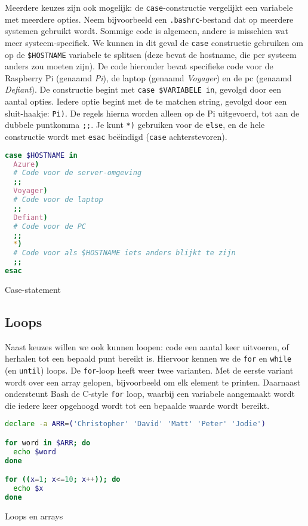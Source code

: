 Meerdere keuzes zijn ook mogelijk: de \texttt{case}-constructie vergelijkt een variabele met meerdere opties. Neem bijvoorbeeld een \texttt{.bashrc}-bestand dat op meerdere systemen gebruikt wordt. Sommige code is algemeen, andere is misschien wat meer systeem-specifiek. We kunnen in dit geval de \texttt{case} constructie gebruiken om op de \texttt{\$HOSTNAME} variabele te splitsen (deze bevat de hostname, die per systeem anders zou moeten zijn). De code hieronder bevat specifieke code voor de Raspberry Pi (genaamd \emph{Pi}), de laptop (genaamd \emph{Voyager}) en de pc (genaamd \emph{Defiant}). De constructie begint met \texttt{case\ \$VARIABELE\ in}, gevolgd door een aantal opties. Iedere optie begint met de te matchen string, gevolgd door een sluit-haakje: \texttt{Pi)}. De regels hierna worden alleen op de Pi uitgevoerd, tot aan de dubbele puntkomma \texttt{;;}. Je kunt \texttt{*)} gebruiken voor de \texttt{else}, en de hele constructie wordt met \texttt{esac} beëindigd (\texttt{case} achterstevoren).

\begin{listing}
\begin{lstlisting}[language=Bash]
case $HOSTNAME in
  Azure)
  # Code voor de server-omgeving
  ;;
  Voyager)
  # Code voor de laptop
  ;;
  Defiant)
  # Code voor de PC
  ;;
  *)
  # Code voor als $HOSTNAME iets anders blijkt te zijn
  ;;
esac
\end{lstlisting}
\caption{Case-statement}
\end{listing}

\subsection{Loops}\label{loops}

Naast keuzes willen we ook kunnen loopen: code een aantal keer uitvoeren, of herhalen tot een bepaald punt bereikt is. Hiervoor kennen we de \texttt{for} en \texttt{while} (en \texttt{until}) loops. De \texttt{for}-loop heeft weer twee varianten. Met de eerste variant wordt over een array gelopen, bijvoorbeeld om elk element te printen. Daarnaast ondersteunt Bash de C-style \texttt{for} loop, waarbij een variabele aangemaakt wordt die iedere keer opgehoogd wordt tot een bepaalde waarde wordt bereikt.

\begin{listing}
\begin{lstlisting}[language=Bash]
declare -a ARR=('Christopher' 'David' 'Matt' 'Peter' 'Jodie')

for word in $ARR; do
  echo $word 
done

for ((x=1; x<=10; x++)); do 
  echo $x
done
\end{lstlisting}
\caption{Loops en arrays}
\end{listing}

